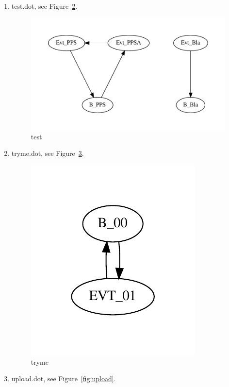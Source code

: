 \documentclass[12pt,a4paper]{report}
\begin{document}
\begin{enumerate}
\begin{figure}
        \label{fig:test_cmd}
    \end{figure}
\item test.dot, see Figure~\ref{fig:test}.
    \begin{figure}
        \centering
        \includegraphics*[width=1.0\textwidth,keepaspectratio]{TestPattern/test.pdf}
        \caption{test}
        \label{fig:test}
    \end{figure}
\item tryme.dot, see Figure~\ref{fig:tryme}.
    \begin{figure}
        \centering
        \includegraphics{TestPattern/tryme.pdf}
        \caption{tryme}
        \label{fig:tryme}
    \end{figure}
\item upload.dot, see Figure~\ref{fig:upload}.
    \begin{figure}

\end{figure}
\end{enumerate}
\end{document}

